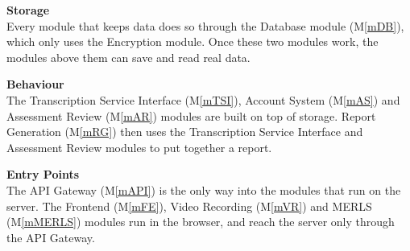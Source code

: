 \documentclass[12pt, titlepage]{article}
\newcommand{\mref}[1]{M\ref{#1}}
\begin{document}
\vspace{\baselineskip}
\noindent \textbf{Storage}\\
Every module that keeps data does so through the Database module (\mref{mDB}), which only uses the Encryption module. Once these two modules work, the modules above them can save and read real data.

\vspace{\baselineskip}
\noindent \textbf{Behaviour}\\
The Transcription Service Interface (\mref{mTSI}), Account System (\mref{mAS}) and Assessment Review (\mref{mAR}) modules are built on top of storage. Report Generation (\mref{mRG}) then uses the Transcription Service Interface and Assessment Review modules to put together a report.

\vspace{\baselineskip}
\noindent \textbf{Entry Points}\\
The API Gateway (\mref{mAPI}) is the only way into the modules that run on the server. The Frontend (\mref{mFE}), Video Recording (\mref{mVR}) and MERLS (\mref{mMERLS}) modules run in the browser, and reach the server only through the API Gateway.
\end{document}
